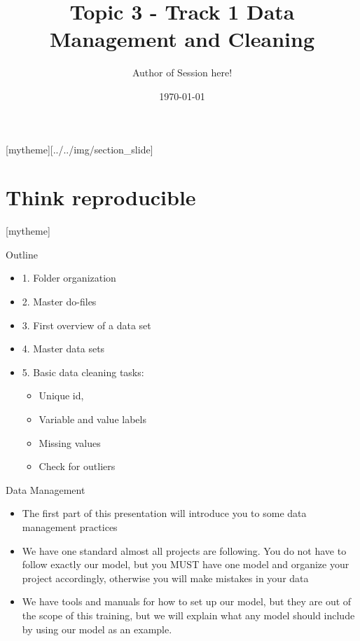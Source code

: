 \documentclass[aspectratio=169]{beamer}
\title{Topic 3 - Track 1 \newline Data Management and Cleaning}
\date{\today}
\author{Author of Session here!} %
\institute{Development Impact Evaluation (DIME) \newline The World Bank }
\newcommand{\sectionpic}[2]{
	\setbeamertemplate{section page}[mytheme][#2]
	\section{#1}
	\setbeamertemplate{section page}[mytheme]
}
\begin{document}
{
	\maketitle
}

\sectionpic{Think reproducible}{../../img/section_slide}


\begin{frame}{Outline}
	\begin{itemize}
		\item 1. Folder organization
		\item 2. Master do-files
		\item 3. First overview of a data set
		\item 4. Master data sets
		\item 5. Basic data cleaning tasks:
			\begin{itemize}
				\item Unique id,
				\item Variable and value labels
				\item Missing values
				\item Check for outliers
			\end{itemize}
	\end{itemize}
\end{frame}


\begin{frame}{Data Management}
	\begin{itemize}
		\item The first part of this presentation will introduce you to some data management practices
		\item We have one standard almost all projects are following. You do not have to follow exactly our model, but you MUST have one model and organize your project accordingly, otherwise you will make mistakes in your data
		\item We have tools and manuals for how to set up our model, but they are out of the scope of this training, but we will explain what any model should include by using our model as an example.
	\end{itemize}
\end{frame}
\end{document}
